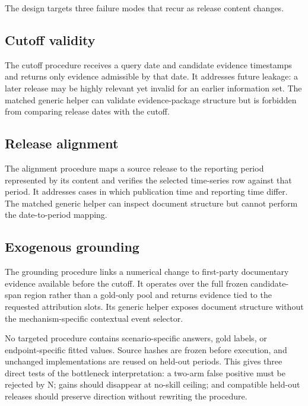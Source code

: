 The design targets three failure modes that recur as release content changes.

\subsection{Cutoff validity}
The cutoff procedure receives a query date and candidate evidence timestamps and returns only evidence admissible by that date. It addresses future leakage: a later release may be highly relevant yet invalid for an earlier information set. The matched generic helper can validate evidence-package structure but is forbidden from comparing release dates with the cutoff.

\subsection{Release alignment}
The alignment procedure maps a source release to the reporting period represented by its content and verifies the selected time-series row against that period. It addresses cases in which publication time and reporting time differ. The matched generic helper can inspect document structure but cannot perform the date-to-period mapping.

\subsection{Exogenous grounding}
The grounding procedure links a numerical change to first-party documentary evidence available before the cutoff. It operates over the full frozen candidate-span region rather than a gold-only pool and returns evidence tied to the requested attribution slots. Its generic helper exposes document structure without the mechanism-specific contextual event selector.

No targeted procedure contains scenario-specific answers, gold labels, or endpoint-specific fitted values. Source hashes are frozen before execution, and unchanged implementations are reused on held-out periods. This gives three direct tests of the bottleneck interpretation: a two-arm false positive must be rejected by N; gains should disappear at no-skill ceiling; and compatible held-out releases should preserve direction without rewriting the procedure.
